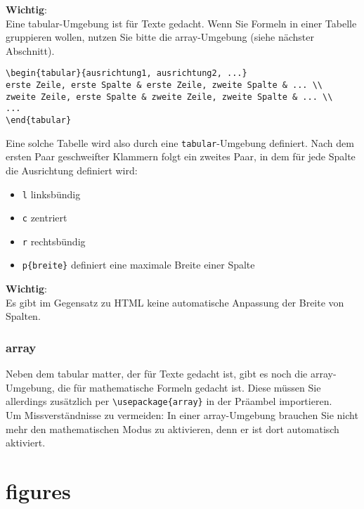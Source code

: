 \textbf{Wichtig}:\\

Eine tabular-Umgebung ist für Texte gedacht. Wenn Sie Formeln in einer Tabelle gruppieren wollen, nutzen Sie bitte die array-Umgebung (siehe nächster Abschnitt).

\begin{verbatim}
\begin{tabular}{ausrichtung1, ausrichtung2, ...}
erste Zeile, erste Spalte & erste Zeile, zweite Spalte & ... \\
zweite Zeile, erste Spalte & zweite Zeile, zweite Spalte & ... \\
...
\end{tabular}
\end{verbatim}

Eine solche Tabelle wird also durch eine \verb|tabular|-Umgebung definiert. Nach dem ersten Paar geschweifter Klammern folgt ein zweites Paar, in dem für jede Spalte die Ausrichtung definiert wird:

\begin{itemize}
	\item \verb|l| linksbündig
	\item \verb|c| zentriert
	\item \verb|r| rechtsbündig
	\item \verb|p{breite}| definiert eine maximale Breite einer Spalte
\end{itemize}

\textbf{Wichtig}:\\

Es gibt im Gegensatz zu HTML keine automatische Anpassung der Breite von Spalten.

\subsubsection{array}

Neben dem tabular matter, der für Texte gedacht ist, gibt es noch die array-Umgebung, die für mathematische Formeln gedacht ist. Diese müssen Sie allerdings zusätzlich per \verb|\usepackage{array}| in der Präambel importieren.\\

Um Missverständnisse zu vermeiden: In einer array-Umgebung brauchen Sie nicht mehr den mathematischen Modus zu aktivieren, denn er ist dort automatisch aktiviert.

\section{figures}

